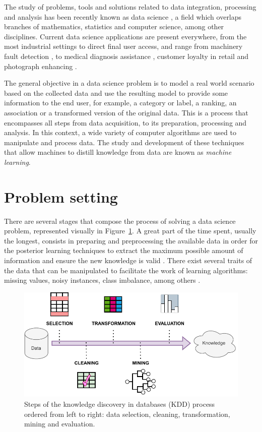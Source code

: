 The study of problems, tools and solutions related to data integration, processing and analysis has been recently known as data science , a field which overlaps branches of mathematics, statistics and computer science, among other disciplines. Current data science applications are present everywhere, from the most industrial settings to direct final user access, and range from machinery fault detection , to medical diagnosis assistance , customer loyalty in retail  and photograph enhancing .

The general objective in a data science problem is to model a real world scenario based on the collected data and use the resulting model to provide some information to the end user, for example, a category or label, a ranking, an association or a transformed version of the original data. This is a process that encompasses all steps from data acquisition, to its preparation, processing and analysis. In this context, a wide variety of computer algorithms are used to manipulate and process data. The study and development of these techniques that allow machines to distill knowledge from data are known as \textit{machine learning}.

\section{Problem setting}

There are several stages that compose the process of solving a data science problem, represented visually in Figure~\ref{fig:kdd}. A great part of the time spent, usually the longest, consists in preparing and preprocessing the available data in order for the posterior learning techniques to extract the maximum possible amount of information and ensure the new knowledge is valid . There exist several traits of the data that can be manipulated to facilitate the work of learning algorithms: missing values, noisy instances, class imbalance, among others .

\begin{figure}
    \includegraphics[width=\linewidth]{images/kddprocess.pdf}
    \caption{\label{fig:kdd}Steps of the knowledge discovery in databases (KDD) process ordered from left to right: data selection, cleaning, transformation, mining and evaluation.}
\end{figure}

